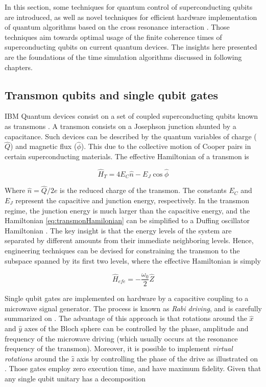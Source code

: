   In this section, some techniques for quantum control of superconducting qubits are introduced, as well as novel techniques for efficient hardware implementation of quantum algorithms based on the cross resonance interaction \cite{RXZPulseEfficient, 2016RZXCalibration}. Those techniques aim towards optimal usage of the finite coherence times of superconducting qubits on current quantum devices. The insights here presented are the foundations of the time simulation algorithms discussed in following chapters.

  \subsection{Transmon qubits and single qubit gates}

  IBM Quantum devices consist on a set of coupled superconducting qubits known as transmons \cite{Qiskit, quantumEngineer}. A transmon consists on a Josephson junction shunted by a capacitance. Such devices can be described by the quantum variables of charge ($\hat{Q}$) and magnetic flux ($\hat{\phi}$). This due to the collective motion of Cooper pairs in certain superconducting materials. The effective Hamiltonian of a transmon is \cite{quantumEngineer}

  \begin{equation}
    \hat{H}_T = 4E_C \hat{n} - E_J \cos{\hat{\phi}}
    \label{eq:transmonHamilonian}
  \end{equation}

  Where $\hat{n} = \hat{Q}/2e$ is the reduced charge of the transmon. The constants $E_C$ and $E_J$ represent the capacitive and junction energy, respectively. In the transmon regime, the junction energy is much larger than the capacitive energy, and the Hamiltonian \ref{eq:transmonHamilonian} can be simplified to a Duffing oscillator Hamiltonian \cite{quantumEngineer}. The key insight is that the energy levels of the system are separated by different amounts from their immediate neighboring levels. Hence, engineering techniques can be devised for constraining the transmon to the subspace spanned by its first two levels, where the effective Hamiltonian is simply

  \begin{equation}
    \hat{H}_{efe} = -\frac{\omega_0}{2} \hat{Z}
    \label{eq:qubitHamiltonian}
  \end{equation}

  Single qubit gates are implemented on hardware by a capacitive coupling to a microwave signal generator. The process is known as \textit{Rabi driving}, and is carefully summarized on \cite{quantumEngineer}. The advantage of this approach is that rotations around the $\hat{x}$ and $\hat{y}$ axes of the Bloch sphere can be controlled by the phase, amplitude and frequency of the microwave driving (which usually occurs at the resonance frequency of the transmon). Moreover, it is possible to implement \textit{virtual rotations} around the $\hat{z}$ axis by controlling the phase of the drive as illustrated on \cite{quantumEngineer}. Those gates employ zero execution time, and have maximum fidelity. Given that any single qubit unitary has a decomposition

